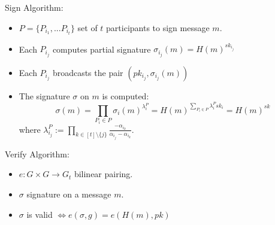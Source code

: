 \begin{frame}
Sign Algorithm:
\begin{itemize}
\item $P = \{P_{i_1}, ... P_{i_t} \}$ set of $t$ participants to sign message $m$.
\item Each $P_{i_j}$ computes partial signature $\sigma_{i_j}(m) = H(m)^{sk_{i_j}}$
\item Each $P_{i_j}$ broadcasts the pair $(pk_{i_j}, \sigma_{i_j}(m))$
\item The signature $\sigma$ on $m$ is computed:
$$ \sigma(m) = \prod_{P_i \in P} \sigma_i (m)^{\lambda_i^{P}}= H(m)^{\sum_{P_i \in P} \lambda_i^P sk_i} = H(m)^{sk}$$
where $\lambda_{i_j}^P := \prod_{k \in [t] \setminus \{j\}} \frac{-\alpha_{i_k}}{\alpha_{i_j} - \alpha_{i_k}}$.
\end{itemize}
\end{frame}

\begin{frame}
Verify Algorithm:
\begin{itemize}
\item $e: G \times G \rightarrow G_t$ bilinear pairing.
\item $\sigma$ signature on a message $m$.
\item $\sigma$ is valid $\Leftrightarrow e(\sigma,g) = e(H(m),pk)$ 
\end{itemize}
\end{frame}
